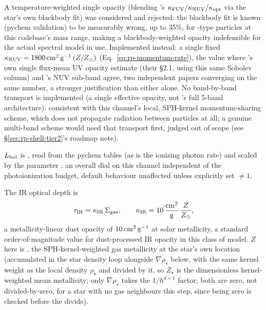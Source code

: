 A temperature-weighted single opacity (blending
\citet{Hopkins2020}'s $\kappa_{\rm FUV}/\kappa_{\rm NUV}/\kappa_{\rm opt}$
via the star's own blackbody fit) was considered and rejected: the
blackbody fit is known (pychem validation) to be measurably wrong, up to
35\%, for -type particles at this codebase's mass
range, making a blackbody-weighted opacity indefensible for the actual
spectral model in use. Implemented instead: a single fixed
$\kappa_{\rm NUV}=1800\,{\rm cm^2\,g^{-1}}\,(Z/Z_\odot)$
(Eq.~\ref{eq:rp-momentum-rate}), the value where \citet{Hopkins2012a}'s own
single flux-mean UV opacity estimate (their \S2.1, using this same
Sobolev column) and \citet{Hopkins2020}'s NUV sub-band agree, two
independent papers converging on the same number, a stronger
justification than either alone. No band-by-band transport is
implemented (a single effective opacity, not \citet{Hopkins2020}'s full
5-band architecture): consistent with this channel's local, SPH-kernel
momentum-sharing scheme, which does not propagate radiation between
particles at all; a genuine multi-band scheme would need that transport
first, judged out of scope (see \S\ref{sec:rp-shell-tier2}'s roadmap
note).

$L_{\rm bol}$ is , read from
the pychem tables (as is the ionizing photon rate) and scaled
by the parameter :
an overall dial on this channel independent of the photoionization
budget, default behaviour unaffected unless explicitly set $\ne1$.

The IR optical depth is
\begin{equation}
  \tau_{\rm IR} = \kappa_{\rm IR}\,\Sigma_{\rm gas}, \qquad
  \kappa_{\rm IR} = 10\,\frac{\rm cm^2}{\rm g}\,\frac{Z}{Z_\odot},
  \label{eq:rp-tauIR}
\end{equation}
a metallicity-linear
dust opacity of $10\,{\rm cm^2\,g^{-1}}$ at solar metallicity, a
standard order-of-magnitude value for dust-processed IR opacity in this
class of model. $Z$ here is , the
SPH-kernel-weighted gas metallicity at the star's own location
(accumulated in the star density loop
alongside $\nabla\rho_\star$ below, with the same kernel weight as the
local density $\rho_\star$ and divided by it, so $Z_\star$ is the
dimensionless kernel-weighted mean metallicity; only $\nabla\rho_\star$
takes the $1/h^{d+1}$ factor; both are zero, not divided-by-zero,
for a star with no gas neighbours this step, since
 being zero is checked before the divide).

